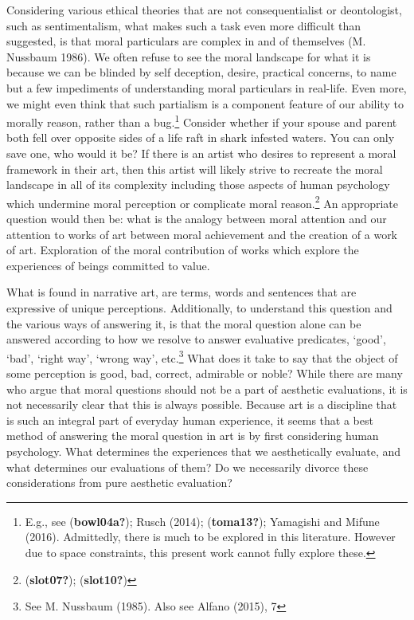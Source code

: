 \documentclass[12pt]{book}
\theoremstyle{definition}
\theoremstyle{remark}
\begin{document}
Considering various ethical theories that are not consequentialist or deontologist, such as sentimentalism, what makes such a task even more difficult than suggested, is that moral particulars are complex in and of themselves (M. Nussbaum 1986). We often refuse to see the moral landscape for what it is because we can be blinded by self deception, desire, practical concerns, to name but a few impediments of understanding moral particulars in real-life. Even more, we might even think that such partialism is a component feature of our ability to morally reason, rather than a bug.\footnote{E.g., see (\textbf{bowl04a?}); Rusch (2014); (\textbf{toma13?}); Yamagishi and Mifune (2016). Admittedly, there is much to be explored in this literature. However due to space constraints, this present work cannot fully explore these.} Consider whether if your spouse and parent both fell over opposite sides of a life raft in shark infested waters. You can only save one, who would it be? If there is an artist who desires to represent a moral framework in their art, then this artist will likely strive to recreate the moral landscape in all of its complexity including those aspects of human psychology which undermine moral perception or complicate moral reason.\footnote{(\textbf{slot07?}); (\textbf{slot10?})} An appropriate question would then be: what is the analogy between moral attention and our attention to works of art between moral achievement and the creation of a work of art. Exploration of the moral contribution of works which explore the experiences of beings committed to value.

What is found in narrative art, are terms, words and sentences that are expressive of unique perceptions. Additionally, to understand this question and the various ways of answering it, is that the moral question alone can be answered according to how we resolve to answer evaluative predicates, `good', `bad', `right way', `wrong way', etc.\footnote{See M. Nussbaum (1985). Also see Alfano (2015), 7} What does it take to say that the object of some perception is good, bad, correct, admirable or noble? While there are many who argue that moral questions should not be a part of aesthetic evaluations, it is not necessarily clear that this is always possible. Because art is a discipline that is such an integral part of everyday human experience, it seems that a best method of answering the moral question in art is by first considering human psychology. What determines the experiences that we aesthetically evaluate, and what determines our evaluations of them? Do we necessarily divorce these considerations from pure aesthetic evaluation?
\end{document}
